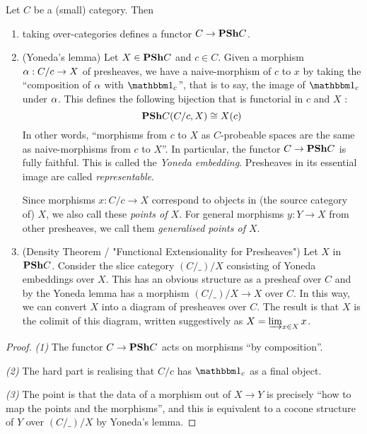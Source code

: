 \documentclass{article}
\begin{document}
\begin{prop}

  Let $ C$ be a (small) category.
  Then 
  \begin{enumerate}
    \item taking over-categories defines a functor
    $C \to \mathbf{PSh} C$.
    \item (Yoneda's lemma) Let $X \in \mathbf{PSh} C$ and $c \in  C$.
    Given a morphism $\alpha : C / c \to X$ of presheaves,
    we have a naive-morphism of $c$ to $x$ by taking
    the ``composition of $\alpha$ with $\id{c}$'',
    that is to say, the image of $\id{c}$ under $\alpha$.
    This defines the following bijection that is functorial in $c$ and $X$ : 
    \[
      \mathbf{PSh} C (C / c , X) \cong X (c)
    \]
    In other words, 
    ``morphisms from $c$ to $X$ as $C$-probeable spaces
    are the same as naive-morphisms from $c$ to $X$''.
    In particular,
    the functor $C \to \mathbf{PSh} C$ is fully faithful.
    This is called the \emph{Yoneda embedding}.
    Presheaves in its essential image are called \emph{representable}.

    Since morphisms $x : C / c \to X$ correspond to objects 
    in (the source category of) $X$,
    we also call these \emph{points of $X$}.
    For general morphisms $y : Y \to X$ from other presheaves,
    we call them \emph{generalised points of $X$}.
    \item (Density Theorem / "Functional Extensionality for Presheaves") 
    Let $X$ in $\mathbf{PSh} C$.
    Consider the slice category $(C / \_ ) / X$
    consisting of Yoneda embeddings over $X$.
    This has an obvious structure as a presheaf over $C$
    and by the Yoneda lemma has a morphism $(C / \_)/ X \to X$ over $C$.
    In this way, we can convert $X$ into a diagram of presheaves over $C$.
    The result is that $X$ is the colimit of this diagram,
    written suggestively as $X = \varinjlim_{x \in X} x$.
  \end{enumerate} 
\end{prop}
\begin{proof}
  \textit{(1)} The functor $C \to \mathbf{PSh} C$ acts on morphisms
  ``by composition''.

  \textit{(2)} 
  The hard part is realising that $C / c$ has $\id{c}$ as a final object.

  \textit{(3)} The point is that
  the data of a morphism out of $X \to Y$ is precisely 
  ``how to map the points and the morphisms'',
  and this is equivalent to a cocone structure of $Y$ over $(C / \_) / X$
  by Yoneda's lemma.
  
\end{proof}
\end{document}
